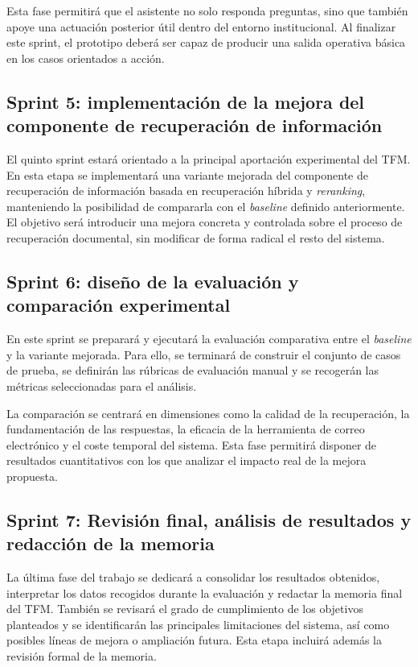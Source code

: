 Esta fase permitirá que el asistente no solo responda preguntas, sino que también apoye una actuación posterior útil dentro del entorno institucional. 
Al finalizar este sprint, el prototipo deberá ser capaz de producir una salida operativa básica en los casos orientados a acción.

\subsection{Sprint 5: implementación de la mejora del componente de recuperación de información}

El quinto sprint estará orientado a la principal aportación experimental del TFM. 
En esta etapa se implementará una variante mejorada del componente de recuperación de información basada en recuperación híbrida y \textit{reranking}, manteniendo la posibilidad de compararla con el \textit{baseline} definido anteriormente.
El objetivo será introducir una mejora concreta y controlada sobre el proceso de recuperación documental, sin modificar de forma radical el resto del sistema. 

\subsection{Sprint 6: diseño de la evaluación y comparación experimental}

En este sprint se preparará y ejecutará la evaluación comparativa entre el \textit{baseline} y la variante mejorada. 
Para ello, se terminará de construir el conjunto de casos de prueba, se definirán las rúbricas de evaluación manual y se recogerán las métricas seleccionadas para el análisis.

La comparación se centrará en dimensiones como la calidad de la recuperación, la fundamentación de las respuestas, la eficacia de la herramienta de correo electrónico y el coste temporal del sistema. 
Esta fase permitirá disponer de resultados cuantitativos con los que analizar el impacto real de la mejora propuesta.

\subsection{Sprint 7: Revisión final, análisis de resultados y redacción de la memoria}

La última fase del trabajo se dedicará a consolidar los resultados obtenidos, interpretar los datos recogidos durante la evaluación y redactar la memoria final del TFM. 
También se revisará el grado de cumplimiento de los objetivos planteados y se identificarán las principales limitaciones del sistema, así como posibles líneas de mejora o ampliación futura.
Esta etapa incluirá además la revisión formal de la memoria.

